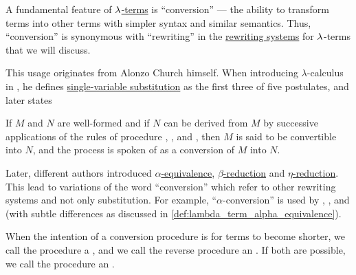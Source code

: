 \begin{concept}\label{con:lambda_conversion}
  A fundamental feature of \hyperref[def:lambda_term]{\( {\mathrm \lambda} \)-terms} is \enquote{conversion} --- the ability to transform terms into other terms with simpler syntax and similar semantics. Thus, \enquote{conversion} is synonymous with \enquote{rewriting} in the \hyperref[def:rewriting_system]{rewriting systems} for \( {\mathrm \lambda} \)-terms that we will discuss.

  This usage originates from Alonzo Church himself. When introducing \( \lambda \)-calculus in \cite[357]{Church1932LambdaCalculus}, he defines \hyperref[def:lambda_term_substitution]{single-variable substitution} as the first three of five postulates, and later states
  \begin{displayquote}
    If \( M \) and \( N \) are well-formed and if \( N \) can be derived from \( M \) by successive applications of the rules of procedure , , and , then \( M \) is said to be convertible into \( N \), and the process is spoken of as a conversion of \( M \) into \( N \).
  \end{displayquote}

  Later, different authors introduced \hyperref[def:lambda_term_alpha_equivalence]{\( \alpha \)-equivalence}, \hyperref[def:beta_eta_reduction]{\( \beta \)-reduction} and \hyperref[def:beta_eta_reduction]{\( \eta \)-reduction}. This lead to variations of the word \enquote{conversion} which refer to other rewriting systems and not only substitution. For example, \enquote{\( \alpha \)-conversion} is used by , ,  and  (with subtle differences as discussed in \cref{def:lambda_term_alpha_equivalence}).

  When the intention of a conversion procedure is for terms to become shorter, we call the procedure a , and we call the reverse procedure an . If both are possible, we call the procedure an .
\end{concept}

